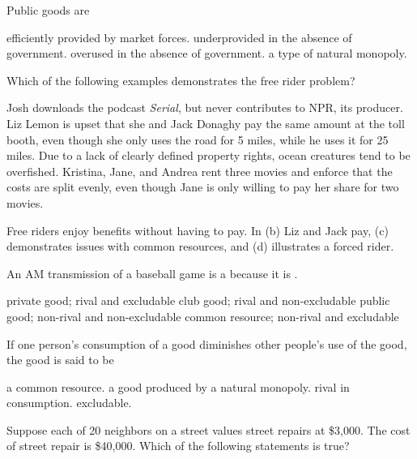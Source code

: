 \documentclass[addpoints,11pt]{exam}
\theoremstyle{definition}
\newcommand{\blank}[0]{\underline{\hspace{3cm}}}
\begin{document}
\begin{questions}
		\question Public goods are 
		
		\begin{choices}
			\choice efficiently provided by market forces.
			\CorrectChoice underprovided in the absence of government.
			\choice overused in the absence of government.
			\choice a type of natural monopoly.
		\end{choices}


		
	\question Which of the following examples demonstrates the free rider problem?
	\begin{choices}
		
		\CorrectChoice Josh downloads the podcast \textit{Serial}, but never contributes to NPR, its producer.
		\choice Liz Lemon is upset that she and Jack Donaghy pay the same amount at the toll booth, even though she only uses the road for 5 miles, while he uses it for 25 miles.
		\choice Due to a lack of clearly defined property rights, ocean creatures tend to be overfished.
		\choice Kristina, Jane, and Andrea rent three movies and enforce that the costs are split evenly, even though Jane is only willing to pay her share for two movies.
	\end{choices}
	
	\begin{solution}
		Free riders enjoy benefits without having to pay. In (b) Liz and Jack pay, (c) demonstrates issues with common resources, and (d) illustrates a forced rider.
	\end{solution}
	
	\question An AM transmission of a baseball game is a \blank because it is \blank.
	
	\begin{choices}
		\choice private good; rival and excludable
		\choice club good; rival and non-excludable
		\CorrectChoice public good; non-rival and non-excludable
		\choice common resource; non-rival and excludable
	\end{choices}
	
\question If one person's consumption of a good diminishes other people's use of the good, the good is said to be

\begin{choices}
	\choice a common resource.
	\choice a good produced by a natural monopoly.
	\CorrectChoice rival in consumption.
	\choice excludable.
\end{choices}

\question Suppose each of 20 neighbors on a street values street repairs at \$3,000. The cost of street repair is \$40,000. Which of the following statements is true?


\end{questions}
\end{document}
